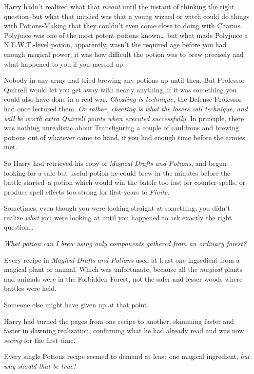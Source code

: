 Harry hadn't realized what that \emph{meant} until the instant of thinking the right question\---but what that implied was that a young wizard or witch could do things with Potions-Making that they couldn't even come close to doing with Charms. Polyjuice was one of the most potent potions known{\ldots} but what made Polyjuice a N.E.W.T.-level potion, apparently, wasn't the required age before you had enough magical power; it was how difficult the potion was to brew precisely and what happened to you if you messed up.

Nobody in any army had tried brewing any potions up until then. But Professor Quirrell would let you get away with nearly anything, if it was something you could also have done in a real war. \emph{Cheating is technique,} the Defense Professor had once lectured them. \emph{Or rather, cheating is what the losers call technique, and will be worth extra Quirrell points when executed successfully.} In principle, there was nothing unrealistic about Transfiguring a couple of cauldrons and brewing potions out of whatever came to hand, if you had enough time before the armies met.

So Harry had retrieved his copy of \emph{Magical Drafts and Potions}, and begun looking for a safe but useful potion he could brew in the minutes before the battle started\---a potion which would win the battle too fast for counter-spells, or produce spell effects too strong for first-years to \emph{Finite}.

Sometimes, even though you were looking straight at something, you didn't realize \emph{what} you were looking at until you happened to ask exactly the right question{\ldots}

\emph{What potion can I brew using only components gathered from an ordinary forest?}

Every recipe in \emph{Magical Drafts and Potions} used at least one ingredient from a magical plant or animal. Which was unfortunate, because all the \emph{magical} plants and animals were in the Forbidden Forest, not the safer and lesser woods where battles were held.

Someone else might have given up at that point.

Harry had turned the pages from one recipe to another, skimming faster and faster in dawning realization, confirming what he had already read and was now \emph{seeing} for the first time.

Every single Potions recipe seemed to demand at least one magical ingredient, \emph{but why should that be true}?

